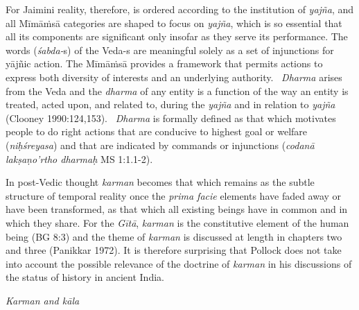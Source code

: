 For Jaimini reality, therefore, is ordered according to the institution of \textit{yajña}, and all Mīmāṁsā categories are shaped to focus on \textit{yajña}, which is so essential that all its components are significant only insofar as they serve its performance. The words (\textit{śabda-}s) of the Veda-s are meaningful solely as a set of injunctions for yājñic action. The Mīmāṁsā provides a framework that permits actions to express both diversity of interests and an underlying authority.  \textit{Dharma} arises from the Veda and the \textit{dharma} of any entity is a function of the way an entity is treated, acted upon, and related to, during the \textit{yajña} and in relation to \textit{yajña} (Clooney 1990:124,153).  \textit{Dharma} is formally defined as that which motivates people to do right actions that are conducive to highest goal or welfare (\textit{niḥśreyasa}) and that are indicated by commands or injunctions (\textit{codanā lakṣaṇo'rtho dharmaḥ} MS 1:1.1-2).

In post-Vedic thought \textit{karman} becomes that which remains as the subtle structure of temporal reality once the \textit{prima facie} elements have faded away or have been transformed, as that which all existing beings have in common and in which they share. For the \textit{Gītā}, \textit{karman} is the constitutive element of the human being (BG 8:3) and the theme of \textit{karman} is discussed at length in chapters two and three (Panikkar 1972). It is therefore surprising that Pollock does not take into account the possible relevance of the doctrine of \textit{karman} in his discussions of the status of history in ancient India.

\textit{Karman and kāla}

